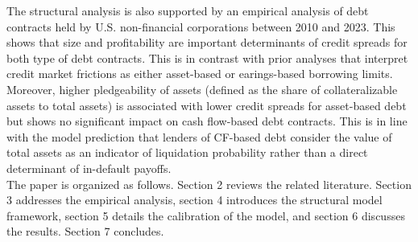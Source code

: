 \documentclass[12pt]{article}
\begin{document}
The structural analysis is also supported by an empirical analysis of debt contracts held by U.S. non-financial corporations between 2010 and 2023. This shows that size and profitability are important determinants of credit spreads for both type of debt contracts. This is in contrast with prior analyses that interpret credit market frictions as either asset-based or earings-based borrowing limits. Moreover, higher pledgeability of assets (defined as the share of collateralizable assets to total assets) is associated with lower credit spreads for asset-based debt but shows no significant impact on cash flow-based debt contracts. This is in line with the model prediction that lenders of CF-based debt consider the value of total assets as an indicator of liquidation probability rather than a direct determinant of in-default payoffs. \vspace{3mm} \\
The paper is organized as follows. Section 2 reviews the related literature. Section 3 addresses the empirical analysis, section 4 introduces the structural model framework, section 5 details the calibration of the model, and section 6 discusses the results. Section 7 concludes.
\end{document}

